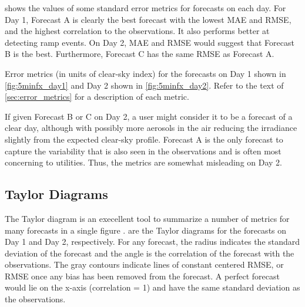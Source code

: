  shows the values of some standard error metrics
for forecasts on each day.
For Day 1, Forecast A is clearly the best forecast with the lowest
MAE and RMSE, and the highest correlation to the observations.
It also performs better at detecting ramp events.
On Day 2, MAE and RMSE would suggest that Forecast B is the best.
Furthermore, Forecast C has the same RMSE as Forecast A.

\begin{table}[htbp]
\centering
\caption[Error metrics for contrived test forecasts]{Error metrics (in units
of clear-sky index) for the forecasts on Day 1 shown in
\cref{fig:5minfx_day1} and Day 2 shown in
\cref{fig:5minfx_day2}. Refer to the text of \cref{sec:error_metrics}
for a description of each metric.}
\label{table:fx_errs}
\vspace{.3em}
\captionsetup{position=top}
\hspace{3em}
\end{table}

If given Forecast B or C on Day 2, a user might consider it to be a
forecast of a clear day, although with possibly more aerosols in the
air reducing the irradiance slightly from the expected clear-sky
profile.
Forecast A is the only forecast to capture the variability that is
also seen in the observations and is often most concerning to
utilities.
Thus, the metrics are somewhat misleading on Day 2.

\subsection{Taylor Diagrams}
The Taylor diagram is an execellent tool to summarize a number of
metrics for many forecasts in a single figure \citep{Taylor2001}.
 are the Taylor diagrams for the
forecasts on Day 1 and Day 2, respectively.
For any forecast, the radius indicates the standard deviation of the
forecast and the angle is the correlation of the forecast with the
observations.
The gray contours indicate lines of constant centered RMSE, or RMSE
once any bias has been removed from the forecast.
A perfect forecast would lie on the x-axis (correlation = 1) and have
the same standard deviation as the observations.

